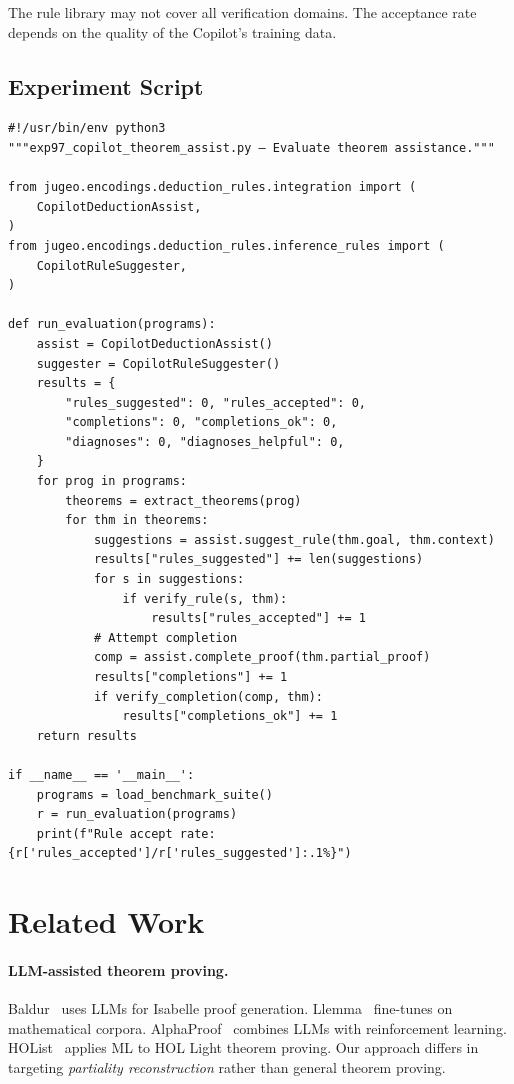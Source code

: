 \documentclass[11pt]{article}
\begin{document}
The rule library may not cover all verification domains.  The acceptance rate
depends on the quality of the Copilot's training data.

\subsection{Experiment Script}

\begin{lstlisting}[style=jugeo-python]
#!/usr/bin/env python3
"""exp97_copilot_theorem_assist.py — Evaluate theorem assistance."""

from jugeo.encodings.deduction_rules.integration import (
    CopilotDeductionAssist,
)
from jugeo.encodings.deduction_rules.inference_rules import (
    CopilotRuleSuggester,
)

def run_evaluation(programs):
    assist = CopilotDeductionAssist()
    suggester = CopilotRuleSuggester()
    results = {
        "rules_suggested": 0, "rules_accepted": 0,
        "completions": 0, "completions_ok": 0,
        "diagnoses": 0, "diagnoses_helpful": 0,
    }
    for prog in programs:
        theorems = extract_theorems(prog)
        for thm in theorems:
            suggestions = assist.suggest_rule(thm.goal, thm.context)
            results["rules_suggested"] += len(suggestions)
            for s in suggestions:
                if verify_rule(s, thm):
                    results["rules_accepted"] += 1
            # Attempt completion
            comp = assist.complete_proof(thm.partial_proof)
            results["completions"] += 1
            if verify_completion(comp, thm):
                results["completions_ok"] += 1
    return results

if __name__ == '__main__':
    programs = load_benchmark_suite()
    r = run_evaluation(programs)
    print(f"Rule accept rate: {r['rules_accepted']/r['rules_suggested']:.1%}")
\end{lstlisting}

\section{Related Work}\label{sec:related}

\paragraph{LLM-assisted theorem proving.}
Baldur~\cite{first2023baldur} uses LLMs for Isabelle proof generation.
Llemma~\cite{azerbayev2024llemma} fine-tunes on mathematical corpora.
AlphaProof~\cite{deepmind2024alphaproof} combines LLMs with reinforcement
learning.  HOList~\cite{bansal2019holist} applies ML to HOL Light theorem
proving.  Our approach differs in targeting \emph{partiality reconstruction}
rather than general theorem proving.
\end{document}
